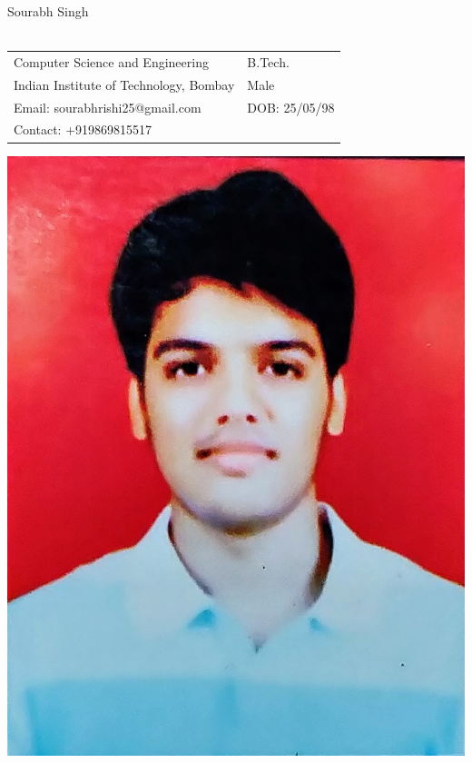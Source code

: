 \documentclass{article}
\begin{document}
\noindent
\begin{minipage}{0.6\textwidth}
  \Large{Sourabh Singh} \\ \\
  \normalsize
  \begin{tabular}{p{7cm} p{30cm}}
  Computer Science and Engineering & B.Tech. \\
  Indian Institute of Technology, Bombay &  Male\\
  Email: sourabhrishi25@gmail.com & DOB: 25/05/98 \\
  Contact: +919869815517 \\
  \end{tabular}
\end{minipage}
\hfill 
\begin{minipage}{0.3\textwidth}\raggedleft
\includegraphics[width=0.5\linewidth]{./photo.jpg}
\end{minipage}


\end{document}
